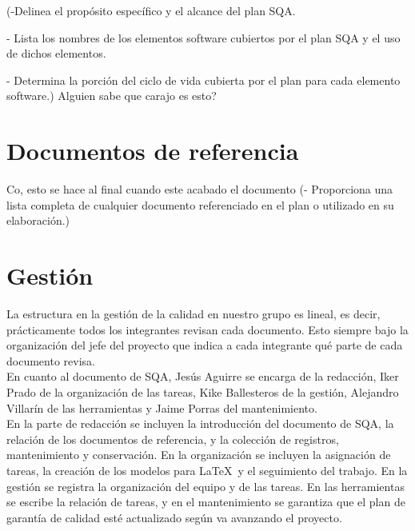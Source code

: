 \documentclass[spanish,a4paper,11pt, twoside]{report}	%
\begin{document}
	(-Delinea el propósito específico y el alcance del plan	SQA.

	- Lista los nombres de los elementos software cubiertos por el plan SQA y el uso de dichos elementos.
		
	- Determina la porción del ciclo de vida cubierta por el plan para cada elemento software.) Alguien sabe que carajo es esto?

\newpage
\mbox{}
\thispagestyle{empty}						%
\newpage

\chapter{ Documentos de referencia}
	Co, esto se hace al final cuando este acabado el documento
	(- Proporciona una lista completa de cualquier documento referenciado en el plan o utilizado en su elaboración.)

\newpage
\mbox{}
\thispagestyle{empty}						%
\newpage

\chapter{ Gestión}%
	La estructura en la gestión de la calidad en nuestro grupo es lineal, es decir, prácticamente todos los integrantes revisan cada documento. Esto siempre bajo la organización del 
	jefe del proyecto que indica a cada integrante qué parte de cada documento revisa.\\

	 En cuanto al documento de SQA, Jesús Aguirre se encarga de la redacción, Iker Prado de la organización de las tareas, Kike Ballesteros de la 
	gestión, Alejandro Villarín de las herramientas y Jaime Porras del mantenimiento.\\

	En la parte de redacción se incluyen  la introducción del documento de SQA, la relación de los documentos de referencia, y la colección de registros, mantenimiento y conservación. En la organización se incluyen  la asignación de tareas, 
	la creación de los modelos para \LaTeX \ y el seguimiento del trabajo. En la gestión se registra la organización del equipo y de las tareas. En las herramientas se escribe la relación de tareas, y en el mantenimiento se garantiza
	que el plan de garantía de calidad esté actualizado según va avanzando el proyecto.\\

	
\end{document}
